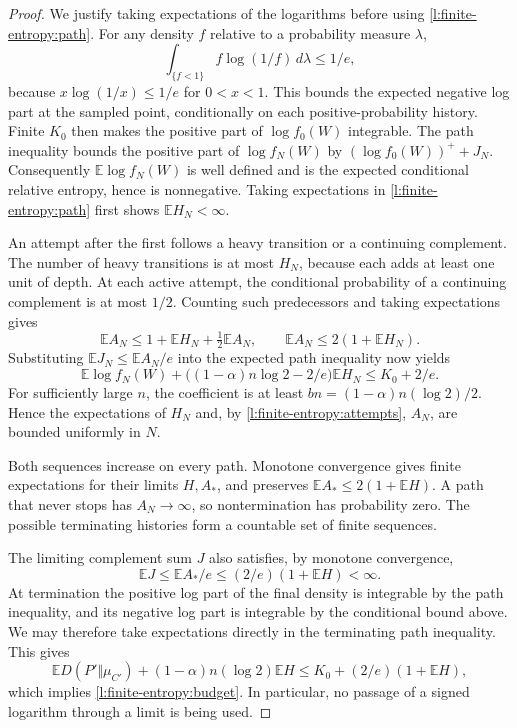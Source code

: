 \begin{proof}
We justify taking expectations of the logarithms before using
\eqref{l:finite-entropy:path}.  For any density \(f\) relative to a
probability measure \(\lambda\),
\[
 \int_{\{f<1\}} f\log(1/f)\,d\lambda\le1/e,
\]
because \(x\log(1/x)\le1/e\) for \(0<x<1\).
This bounds the expected negative log part at the sampled point,
conditionally on each positive-probability history.  Finite \(K_0\)
then makes the positive part of \(\log f_0(W)\) integrable.
The path inequality bounds the positive part of \(\log f_N(W)\)
by \((\log f_0(W))^++J_N\).  Consequently
\(\mathbb E\log f_N(W)\) is well defined and is the expected
conditional relative entropy, hence is nonnegative.  Taking
expectations in \eqref{l:finite-entropy:path} first shows
\(\mathbb EH_N<\infty\).

An attempt after the first follows a heavy transition or a continuing
complement.  The number of heavy transitions is at most \(H_N\),
because each adds at least one unit of depth.  At each active attempt,
the conditional probability of a continuing complement is at most
\(1/2\).  Counting such predecessors and taking expectations gives
\begin{equation}\label{l:finite-entropy:attempts}
 \mathbb EA_N\le1+\mathbb EH_N+\tfrac12\mathbb EA_N,
 \qquad
 \mathbb EA_N\le2(1+\mathbb EH_N).
\end{equation}
Substituting \(\mathbb EJ_N\le\mathbb EA_N/e\) into the expected
path inequality now yields
\begin{equation}\label{l:finite-entropy:truncated}
 \mathbb E\log f_N(W)
 +\bigl((1-\alpha)n\log2-2/e\bigr)\mathbb EH_N
 \le K_0+2/e.
\end{equation}
For sufficiently large \(n\), the coefficient is at least
\(bn=(1-\alpha)n(\log2)/2\).  Hence the expectations of \(H_N\)
and, by \eqref{l:finite-entropy:attempts}, \(A_N\), are bounded
uniformly in \(N\).

Both sequences increase on every path.  Monotone convergence gives
finite expectations for their limits \(H,A_*\), and preserves
\(\mathbb EA_*\le2(1+\mathbb EH)\).  A path that never stops
has \(A_N\to\infty\), so nontermination has probability zero.
The possible terminating histories form a countable set of finite
sequences.

The limiting complement sum \(J\) also satisfies, by monotone
convergence,
\[
 \mathbb EJ\le\mathbb EA_*/e
 \le(2/e)(1+\mathbb EH)<\infty.
\]
At termination the positive log part of the final density is
integrable by the path inequality, and its negative log part is
integrable by the conditional bound above.  We may therefore take
expectations directly in the terminating path inequality.  This gives
\[
 \mathbb E D(P'\Vert\mu_{C'})
 +(1-\alpha)n(\log2)\mathbb EH
 \le K_0+(2/e)(1+\mathbb EH),
\]
which implies \eqref{l:finite-entropy:budget}.  In particular, no
passage of a signed logarithm through a limit is being used.
\end{proof}

